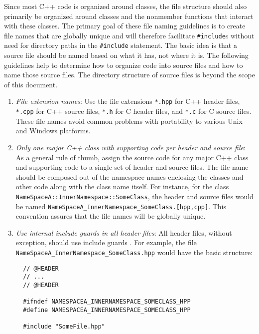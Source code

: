 Since most C++ code is organized around classes, the file structure should
also primarily be organized around classes and the nonmember functions that
interact with these classes.  The primary goal of these file naming guidelines
is to create file names that are globally unique and will therefore facilitate
{}\texttt{\#include}s without need for directory paths in the
{}\texttt{\#include} statement.  The basic idea is that a source file should
be named based on what it has, not where it is.  The following guidelines help
to determine how to organize code into source files and how to name those
source files.  The directory structure of source files is beyond the scope of
this document.

\begin{enumerate}

{}\item\textit{File extension names}: Use the file extensions {}\texttt{*.hpp}
for C++ header files, {}\texttt{*.cpp} for C++ source files, {}\texttt{*.h}
for C header files, and {}\texttt{*.c} for C source files.  These file names
avoid common problems with portability to various Unix and Windows platforms.

{}\item\textit{Only one major C++ class with supporting code per header and
source file}: As a general rule of thumb, assign the source code for any major
C++ class and supporting code to a single set of header and source files.  The
file name should be composed out of the namespace names enclosing the classes
and other code along with the class name itself.  For instance, for the class
{}\texttt{NameSpaceA\-::InnerNamespace\-::SomeClass}, the header and source
files would be named
{}\texttt{NameSpaceA\-\_InnerNamespace\-\_SomeClass.[hpp,cpp]}.  This
convention assures that the file names will be globally unique.

{}\item\textit{Use internal include guards in all header files}: All header
files, without exception, should use include guards {}\cite[Item
24]{C++CodingStandards05}.  For example, the file
{}\texttt{NameSpaceA\-\_InnerNamespace\-\_SomeClass.hpp} would have the basic
structure:

{\small\begin{verbatim}
  // @HEADER
  // ...
  // @HEADER

  #ifndef NAMESPACEA_INNERNAMESPACE_SOMECLASS_HPP
  #define NAMESPACEA_INNERNAMESPACE_SOMECLASS_HPP

  #include "SomeFile.hpp"


\end{verbatim}}
\end{enumerate}
